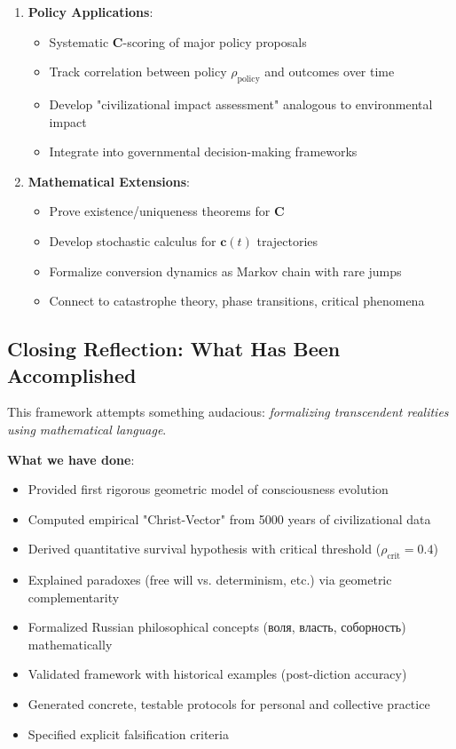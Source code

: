 \documentclass[11pt,a4paper]{article}
\theoremstyle{definition}
\theoremstyle{remark}
\newcommand{\cc}{\mathbf{c}}
\begin{document}
\begin{small}
\begin{enumerate}
\begin{enumerate}[leftmargin=*]
\item \textbf{Policy Applications}:
    \begin{itemize}
        \item Systematic \(\mathbf{C}\)-scoring of major policy proposals
        \item Track correlation between policy \(\rho_{\text{policy}}\) and outcomes over time
        \item Develop "civilizational impact assessment" analogous to environmental impact
        \item Integrate into governmental decision-making frameworks
    \end{itemize}

\item \textbf{Mathematical Extensions}:
    \begin{itemize}
        \item Prove existence/uniqueness theorems for \(\mathbf{C}\)
        \item Develop stochastic calculus for \(\cc(t)\) trajectories
        \item Formalize conversion dynamics as Markov chain with rare jumps
        \item Connect to catastrophe theory, phase transitions, critical phenomena
    \end{itemize}
\end{enumerate}

\subsection{Closing Reflection: What Has Been Accomplished}

This framework attempts something audacious: \textit{formalizing transcendent realities using mathematical language}.

\textbf{What we have done}:
\begin{itemize}
    \item Provided first rigorous geometric model of consciousness evolution
    \item Computed empirical "Christ-Vector" from 5000 years of civilizational data
    \item Derived quantitative survival hypothesis with critical threshold (\(\rho_{\text{crit}} = 0.4\))
    \item Explained paradoxes (free will vs. determinism, etc.) via geometric complementarity
    \item Formalized Russian philosophical concepts (воля, власть, соборность) mathematically
    \item Validated framework with historical examples (post-diction accuracy)
    \item Generated concrete, testable protocols for personal and collective practice
    \item Specified explicit falsification criteria
\end{itemize}


\end{enumerate}
\end{small}
\end{document}
